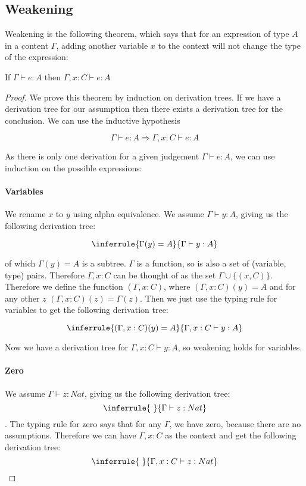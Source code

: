 \subsection{Weakening} 
Weakening is the following theorem, which says that for an expression of type $A$ in a content $\Gamma$, adding another variable $x$ to the context will not change the type of the expression:

\vspace{0.5cm}

\begin{thm}
If $\Gamma \vdash e:A$ then  $\Gamma,x:C \vdash e:A$ 
\end{thm}
 
\begin{proof}
We prove this theorem by induction on derivation trees. If we have a derivation tree for our assumption then there exists a derivation tree for the conclusion. We can use the inductive hypothesis

\[ \Gamma \vdash e : A \Rightarrow \Gamma , x : C \vdash e : A \]


As there is only one derivation for a given judgement $\Gamma \vdash e : A$, we can use induction on the possible expressions:

\paragraph{Variables} We rename $x$ to $y$ using alpha equivalence. We assume $\Gamma \vdash y : A$, giving us the following derivation tree:

$$
\inferrule{\Gamma(y) = A}{\Gamma \vdash y : A}
$$ 

of which $\Gamma(y) = A$ is a subtree. $\Gamma$ is a function, so is also a set of (variable, type) pairs. Therefore $\Gamma, x: C$ can be thought of as the set $\Gamma \cup \{(x,C)\}$. Therefore we define the function $(\Gamma,x:C)$, where $(\Gamma,x:C)(y) = A$ and for any other $z$ $(\Gamma, x:C)(z) = \Gamma(z)$. Then we just use the typing rule for variables to get the following derivation tree:

$$
\inferrule{(\Gamma, x : C) (y) = A}{\Gamma, x : C \vdash y : A}
$$ 

Now we have a derivation tree for $\Gamma, x :C \vdash y : A$, so weakening holds for variables.

\paragraph{Zero} We assume $\Gamma \vdash z : Nat$, giving us the following derivation tree:
$$
\inferrule{ \ }{\Gamma \vdash z : Nat}
$$.
The typing rule for zero says that for any $\Gamma$, we have zero, because there are no assumptions. Therefore we can have $\Gamma, x: C$ as the context and get the following derivation tree:
$$
\inferrule{ \ }{\Gamma,x :C \vdash z : Nat}
$$


\end{proof}
